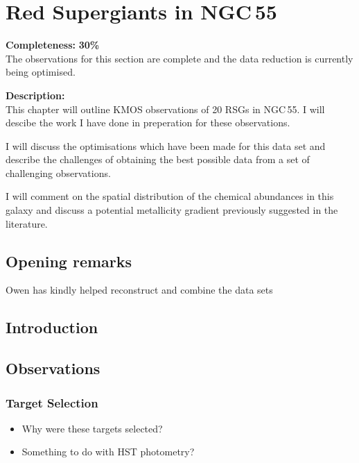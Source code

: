 \chapter{Red Supergiants in NGC\,55}

\textbf{Completeness:} \textbf{30\%} \\
The observations for this section are complete and the data reduction is
currently being optimised.

\textbf{Description:} \\
This chapter will outline KMOS observations of 20 RSGs in NGC\,55.
I will descibe the work I have done in preperation for these observations.

I will discuss the optimisations which have been made for this data set and
describe the challenges of obtaining the best possible data from a set of
challenging observations.

I will comment on the spatial distribution of the chemical abundances in this
galaxy and discuss a potential metallicity gradient previously suggested in
the literature.

\section{Opening remarks} %
\label{sec:opening_remarks}

Owen has kindly helped reconstruct and combine the data sets


\section{Introduction} %
\label{sec:introduction}



\section{Observations} %
\label{sec:observations}

\subsection{Target Selection} %
\label{sub:target_selection}

\begin{itemize}
    \item Why were these targets selected?
    \item Something to do with HST photometry?

\end{itemize}

